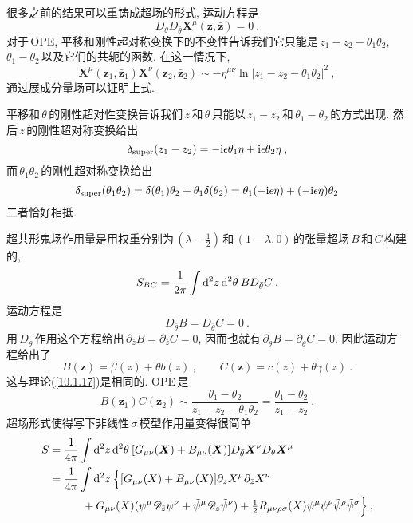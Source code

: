 很多之前的结果可以重铸成超场的形式, 运动方程是
\begin{equation}
    D_{\theta}D_{\bar{\theta}}\bm{X}^{\mu}(\bm{z},\bar{\bm{z}})=0\:. \label{12.3.21}
\end{equation}
对于\,OPE, 平移和刚性超对称变换下的不变性告诉我们它只能是$\,z_{1}-z_{2}-\theta_{1}\theta_{2}$, $\theta_{1}-\theta_{2}\,$以及它们的共轭的函数. 在这一情况下,
\begin{equation}
    \bm{X}^{\mu}(\bm{z}_{1},\bar{\bm{z}}_{1})\bm{X}^{\nu}(\bm{z}_{2},\bar{\bm{z}}_{2})\sim
    -\eta^{\mu\nu}\ln\lvert z_{1}-z_{2}-\theta_{1}\theta_{2}\rvert^{2} \:, \label{12.3.22}
\end{equation}
通过展成分量场可以证明上式.
\begin{tcolorbox}
平移和$\,\theta\,$的刚性超对性变换告诉我们$\,z\,$和$\,\theta\,$只能以$\,z_{1}-z_{2}\,$和$\,\theta_{1}-\theta_{2}\,$的方式出现. 然后$\,z\,$的刚性超对称变换给出
\[
\delta_{\text{super}}(z_{1}-z_{2}) = -\mathrm{i}\epsilon\theta_{1}\eta+\mathrm{i}\epsilon\theta_{2}\eta \:,
\]
而$\,\theta_{1}\theta_{2}\,$的刚性超对称变换给出
\[
\delta_{\text{super}}(\theta_{1}\theta_{2})= \delta(\theta_{1})\theta_{2}+\theta_{1}\delta(\theta_{2})
=\theta_{1}(-\mathrm{i}\epsilon\eta)+(-\mathrm{i}\epsilon\eta)\theta_{2}
\]
二者恰好相抵.
\end{tcolorbox}
超共形鬼场作用量是用权重分别为$\,(\lambda-\frac{1}{2})\,$和$\,(1-\lambda,0)\,$的张量超场$\,B\,$和$\,C\,$构建的,
\begin{equation}
    S_{BC}=\frac{1}{2\pi}\int \mathrm{d}^{2}z\,\mathrm{d}^{2}\theta\: B D_{\bar{\theta}}C \:. \label{12.3.23}
\end{equation}
运动方程是
\begin{equation}
    D_{\bar{\theta}}B= D_{\bar{\theta}}C=0 \:. \label{12.3.24}
\end{equation}
用$\,D_{\bar{\theta}}\,$作用这个方程给出$\,\partial_{\bar{z}}B=\partial_{\bar{z}}C=0$, 因而也就有$\,\partial_{\bar{\theta}}B=\partial_{\bar{\theta}}C=0$. 因此运动方程给出了
\begin{equation}
    B(\bm{z})=\beta(z)+\theta b(z) \:, \qquad C(\bm{z})=c(z)+\theta\gamma(z)\:. \label{12.3.25}
\end{equation}
这与理论(\ref{10.1.17})是相同的. OPE\,是
\begin{equation}
    B(\bm{z}_{1})C(\bm{z}_{2})\sim \frac{\theta_{1}-\theta_{2}}{z_{1}-z_{2}-\theta_{1}\theta_{2}}
    =\frac{\theta_{1}-\theta_{2}}{z_{1}-z_{2}} \:. \label{12.3.26}
\end{equation}
超场形式使得写下非线性\,$\sigma$\,模型作用量变得很简单
\begin{align}
    S &= \frac{1}{4\pi}\int\mathrm{d}^{2}z\,\mathrm{d}^{2}\theta\:[G_{\mu\nu}(\bm{X})+B_{\mu\nu}(\bm{X})]
    D_{\bar{\theta}}\bm{X}^{\nu}D_{\theta}\bm{X}^{\mu} \nonumber \\ 
    &=\frac{1}{4\pi}\int \mathrm{d}^{2}z\:\Bigl\{[G_{\mu\nu}(X)+B_{\mu\nu}(X)]\partial_{z}X^{\mu}\partial_{\bar{z}}X^{\nu}
    \nonumber \\
    &\qquad \quad+G_{\mu\nu}(X)(\psi^{\mu}\mathscr{D}_{\bar{z}}\psi^{\nu}+\tilde{\psi}^{\mu}\mathscr{D}_{z}\tilde{\psi}^{\nu})+\tfrac{1}{2}R_{\mu\nu\rho\sigma}(X)\psi^{\mu}\psi^{\nu}\tilde{\psi}^{\rho}\tilde{\psi}^{\sigma}\Bigr\}\:,
    \label{12.3.27}
\end{align}
